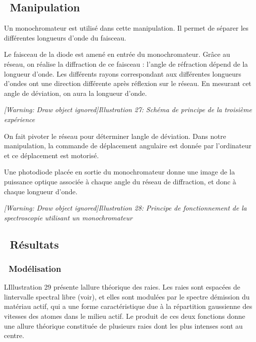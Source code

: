 \documentclass[12pt,twoside]{article}
\begin{document}
\subsection[\ Manipulation]{\ Manipulation}
Un monochromateur est utilis\'e dans cette manipulation. Il permet de
s\'eparer les diff\'erentes longueurs d'onde du faisceau.

Le faisceau de la diode est amen\'e en entr\'ee du monochromateur.
Gr\^ace au r\'eseau, on r\'ealise la diffraction de ce faisceau :
l'angle de r\'efraction d\'epend de la longueur d'onde. Les
diff\'erents rayons correspondant aux diff\'erentes longueurs d'ondes
ont une direction diff\'erente apr\`es r\'eflexion sur le r\'eseau. En
mesurant cet angle de d\'eviation, on aura la longueur d'onde.

\begin{minipage}{15.253cm}
{\itshape
[Warning: Draw object ignored]Illustration 27: Sch\'ema de principe de
la troisi\`eme exp\'erience}
\end{minipage}

On fait pivoter le r\'eseau pour d\'eterminer l{\textquotesingle}angle
de d\'eviation. Dans notre manipulation, la commande de d\'eplacement
angulaire est donn\'ee par l'ordinateur et ce d\'eplacement est
motoris\'e.

Une photodiode plac\'ee en sortie du monochromateur donne une image de
la puissance optique associ\'ee \`a chaque angle du r\'eseau de
diffraction, et donc \`a chaque longueur d'onde.

\begin{minipage}{15.253cm}
{\itshape
[Warning: Draw object ignored]Illustration 28: Principe de
fonctionnement de la spectroscopie utilisant un monochromateur}
\end{minipage}

\subsection[\ R\'esultats]{\ R\'esultats}
\subsubsection[\ Mod\'elisation]{\ Mod\'elisation}
LIllustration 29{\textquotesingle} pr\'esente l{\textquotesingle}allure
th\'eorique des raies. Les raies sont espac\'ees de
l{\textquotesingle}intervalle spectral libre (voir), et elles sont
modul\'ees par le spectre d{\textquotesingle}\'emission du mat\'eriau
actif, qui a une forme caract\'eristique due \`a la r\'epartition
gaussienne des vitesses des atomes dans le milieu actif. Le produit de
ces deux fonctions donne une allure th\'eorique constitu\'ee de
plusieurs raies dont les plus intenses sont au centre.
\end{document}
